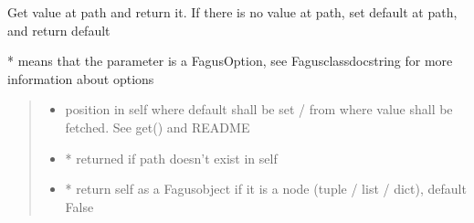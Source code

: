 \documentclass[a4paper,10pt,english]{sphinxmanual}
\begin{document}
\begin{fulllineitems}
\begin{fulllineitems}
\label{\detokenize{fagus.fagus:fagus.fagus.Fagus.setdefault}}
\pysigstartsignatures
{}
\pysigstopsignatures
\sphinxAtStartPar
Get value at path and return it. If there is no value at path, set default at path, and return default

\sphinxAtStartPar
* means that the parameter is a FagusOption, see Fagus\sphinxhyphen{}class\sphinxhyphen{}docstring for more information about options
\begin{quote}\begin{description}
\begin{itemize}
\item {}
\sphinxAtStartPar
{} \textendash{} position in self where default shall be set / from where value shall be fetched. See get() and README

\item {}
\sphinxAtStartPar
{} \textendash{} * returned if path doesn’t exist in self

\item {}
\sphinxAtStartPar
{} \textendash{} * return self as a Fagus\sphinxhyphen{}object if it is a node (tuple / list / dict), default False


\end{itemize}
\end{description}
\end{quote}
\end{fulllineitems}
\end{fulllineitems}
\end{document}
